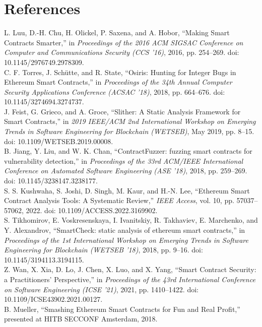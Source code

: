 \documentclass[conference]{IEEEtran}
\begin{document}
\section*{References}
\noindent [1] L. Luu, D.-H. Chu, H. Olickel, P. Saxena, and A. Hobor, ``Making Smart Contracts Smarter,'' in \textit{Proceedings of the 2016 ACM SIGSAC Conference on Computer and Communications Security (CCS '16)}, 2016, pp. 254--269. doi: 10.1145/2976749.2978309. \\[4pt]
\noindent [2] C. F. Torres, J. Schütte, and R. State, ``Osiris: Hunting for Integer Bugs in Ethereum Smart Contracts,'' in \textit{Proceedings of the 34th Annual Computer Security Applications Conference (ACSAC '18)}, 2018, pp. 664--676. doi: 10.1145/3274694.3274737. \\[4pt]
\noindent [3] J. Feist, G. Grieco, and A. Groce, ``Slither: A Static Analysis Framework for Smart Contracts,'' in \textit{2019 IEEE/ACM 2nd International Workshop on Emerging Trends in Software Engineering for Blockchain (WETSEB)}, May 2019, pp. 8--15. doi: 10.1109/WETSEB.2019.00008. \\[4pt]
\noindent [4] B. Jiang, Y. Liu, and W. K. Chan, ``ContractFuzzer: fuzzing smart contracts for vulnerability detection,'' in \textit{Proceedings of the 33rd ACM/IEEE International Conference on Automated Software Engineering (ASE '18)}, 2018, pp. 259--269. doi: 10.1145/3238147.3238177. \\[4pt]
\noindent [5] S. S. Kushwaha, S. Joshi, D. Singh, M. Kaur, and H.-N. Lee, ``Ethereum Smart Contract Analysis Tools: A Systematic Review,'' \textit{IEEE Access}, vol. 10, pp. 57037--57062, 2022. doi: 10.1109/ACCESS.2022.3169902. \\[4pt]
\noindent [6] S. Tikhomirov, E. Voskresenskaya, I. Ivanitskiy, R. Takhaviev, E. Marchenko, and Y. Alexandrov, ``SmartCheck: static analysis of ethereum smart contracts,'' in \textit{Proceedings of the 1st International Workshop on Emerging Trends in Software Engineering for Blockchain (WETSEB '18)}, 2018, pp. 9--16. doi: 10.1145/3194113.3194115. \\[4pt]
\noindent [7] Z. Wan, X. Xia, D. Lo, J. Chen, X. Luo, and X. Yang, ``Smart Contract Security: a Practitioners' Perspective,'' in \textit{Proceedings of the 43rd International Conference on Software Engineering (ICSE '21)}, 2021, pp. 1410--1422. doi: 10.1109/ICSE43902.2021.00127. \\[4pt]
\noindent [8] B. Mueller, ``Smashing Ethereum Smart Contracts for Fun and Real Profit,'' presented at HITB SECCONF Amsterdam, 2018. \\[4pt]
\end{document}
